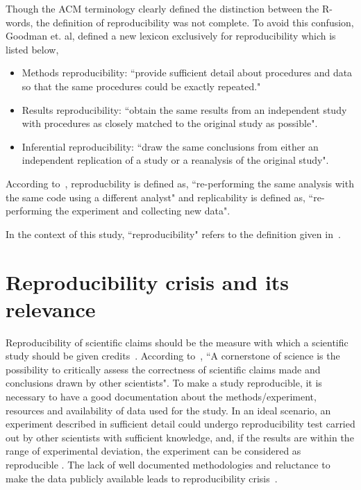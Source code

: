 Though the ACM terminology clearly defined the distinction between the R-words, the definition of reproducibility was not complete. To avoid this confusion, Goodman et. al, defined a new lexicon exclusively for reproducibility \cite{Goodman2016} which is listed below,

\begin{itemize}
\item {Methods reproducibility: ``provide sufficient detail about procedures and data so that the same procedures could be exactly repeated."}
\item {Results reproducibility: ``obtain the same results from an independent study with procedures as closely matched to the original study as possible".}
\item {Inferential reproducibility: ``draw the same conclusions from either an independent replication of a study or a reanalysis of the original study".}
\end{itemize}

According to~\cite{Patil2016}, reproducbility is defined as, ``re-performing the same analysis with the same code using a different analyst" and replicability is defined as, ``re-performing the experiment and collecting new data".

In the context of this study, ``reproducibility" refers to the definition given in~\cite{Patil2016}. 

\section{Reproducibility crisis and its relevance}
Reproducibility of scientific claims should be the measure with which a scientific study should be given credits~\cite{aac4716}. According to~\cite{Plesser2018}, ``A cornerstone of science is the possibility to critically assess the correctness of scientific claims made and conclusions drawn by other scientists".
To make a study reproducible, it is necessary to have a good documentation about the methods/experiment, resources and availability of data used for the study. In an ideal scenario, an experiment described in sufficient detail could undergo reproducibility test carried out by other scientists with sufficient knowledge, and, if the results are within the range of experimental deviation, the experiment can be considered as reproducible \cite{Plesser2018}. The lack of well documented methodologies and reluctance to make the data publicly available leads to reproducibility crisis~\cite{Baker2016}.

